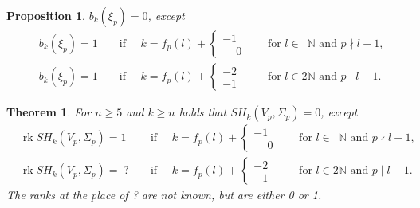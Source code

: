 \documentclass[a4paper,12pt,bibliography=totocnumbered,titlepage=false,abstracton,bookmarksnumbered=true]{scrartcl}
\DeclareMathOperator{\rk}{rk}
\newtheorem{theo}[defn]{Theorem}
\newtheorem{prop}[defn]{Proposition}
\theoremstyle{definition}
\begin{document}
\begin{prop}\label{propgeneratorssigmap}
 $b_k(\xi_p) = 0$, except
 \begin{align*}
 &b_k(\xi_p) = 1&&\text{ if }\quad k=f_p(l)+\left\lbrace\begin{smallmatrix}-1\\\phantom{-}0\end{smallmatrix}\right.&&\text{ for } l\in\phantom{2}\mathbb{N} \text{ and }p\nmid l{-}1,\\
 &b_k(\xi_p) = 1&&\text{ if }\quad k=f_p(l)+\left\lbrace\begin{smallmatrix}-2\\-1\end{smallmatrix}\right.&&\text{ for } l\in2\mathbb{N} \text{ and } p\mid l{-}1.
\end{align*}
\end{prop}
\begin{theo}\label{theoSHofSigmap}
 For $n\geq 5$ and $k\geq n$ holds that $SH_k(V_p,\Sigma_p) = 0$, except
 \begin{align*}
 &\rk SH_k(V_p,\Sigma_p) = 1&&\text{ if }\quad k=f_p(l)+\left\lbrace\begin{smallmatrix}-1\\\phantom{-}0\end{smallmatrix}\right.&&\text{ for } l\in\phantom{2}\mathbb{N} \text{ and }p\nmid l{-}1,\\
 &\rk SH_k(V_p,\Sigma_p) = \;?&&\text{ if }\quad k=f_p(l)+\left\lbrace\begin{smallmatrix}-2\\-1\end{smallmatrix}\right.&&\text{ for } l\in2\mathbb{N} \text{ and } p\mid l{-}1.
\end{align*}
The ranks at the place of ? are not known, but are either 0 or 1.
\end{theo}
\end{document}
